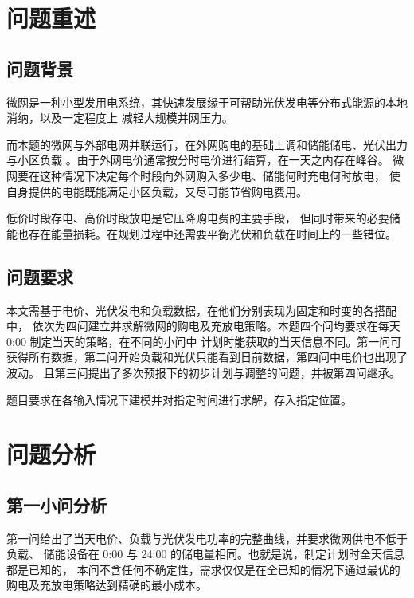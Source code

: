 \documentclass[zihao=-4,a4paper,fontset=none]{ctexart}
\begin{document}
\newpage
\setcounter{page}{1}
\section{问题重述}

\subsection{问题背景}

微网是一种小型发用电系统，其快速发展缘于可帮助光伏发电等分布式能源的本地消纳，以及一定程度上
减轻大规模并网压力。

而本题的微网与外部电网并联运行，在外网购电的基础上调和储能储电、光伏出力与小区负载
。由于外网电价通常按分时电价进行结算，在一天之内存在峰谷。
微网要在这种情况下决定每个时段向外网购入多少电、储能何时充电何时放电，
使自身提供的电能既能满足小区负载，又尽可能节省购电费用。

低价时段存电、高价时段放电是它压降购电费的主要手段，
但同时带来的必要储能也存在能量损耗。在规划过程中还需要平衡光伏和负载在时间上的一些错位。


\subsection{问题要求}

本文需基于电价、光伏发电和负载数据，在他们分别表现为固定和时变的各搭配中，
依次为四问建立并求解微网的购电及充放电策略。本题四个问均要求在每天 0:00 制定当天的策略，在不同的小问中
计划时能获取的当天信息不同。第一问可获得所有数据，第二问开始负载和光伏只能看到日前数据，第四问中电价也出现了波动。
且第三问提出了多次预报下的初步计划与调整的问题，并被第四问继承。

题目要求在各输入情况下建模并对指定时间进行求解，存入指定位置。

\section{问题分析}
\subsection{第一小问分析}

第一问给出了当天电价、负载与光伏发电功率的完整曲线，并要求微网供电不低于负载、
储能设备在 0:00 与 24:00 的储电量相同。也就是说，制定计划时全天信息都是已知的，
本问不含任何不确定性，需求仅仅是在全已知的情况下通过最优的购电及充放电策略达到精确的最小成本。
\end{document}
